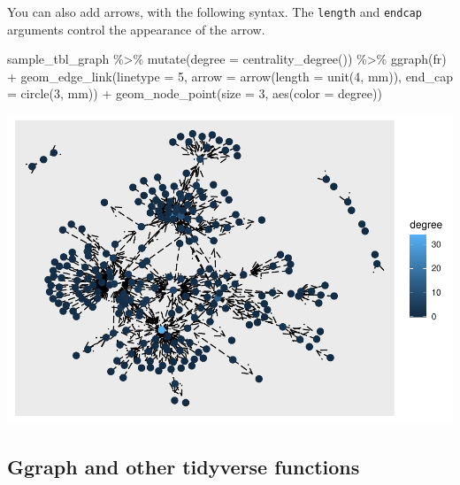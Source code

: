 \documentclass[
]{book}
\newenvironment{Shaded}{\begin{snugshade}}{\end{snugshade}}
\newcommand{\AttributeTok}[1]{\textcolor[rgb]{0.77,0.63,0.00}{#1}}
\newcommand{\DecValTok}[1]{\textcolor[rgb]{0.00,0.00,0.81}{#1}}
\newcommand{\FunctionTok}[1]{\textcolor[rgb]{0.00,0.00,0.00}{#1}}
\newcommand{\NormalTok}[1]{#1}
\newcommand{\SpecialCharTok}[1]{\textcolor[rgb]{0.00,0.00,0.00}{#1}}
\newcommand{\StringTok}[1]{\textcolor[rgb]{0.31,0.60,0.02}{#1}}
\begin{document}
You can also add arrows, with the following syntax. The \texttt{length} and \texttt{endcap} arguments control the appearance of the arrow.

\begin{Shaded}
\begin{Highlighting}[]
\NormalTok{sample\_tbl\_graph }\SpecialCharTok{\%\textgreater{}\%} 
  \FunctionTok{mutate}\NormalTok{(}\AttributeTok{degree =} \FunctionTok{centrality\_degree}\NormalTok{()) }\SpecialCharTok{\%\textgreater{}\%} 
  \FunctionTok{ggraph}\NormalTok{(}\StringTok{\textquotesingle{}fr\textquotesingle{}}\NormalTok{) }\SpecialCharTok{+} 
  \FunctionTok{geom\_edge\_link}\NormalTok{(}\AttributeTok{linetype =} \DecValTok{5}\NormalTok{,}
                 \AttributeTok{arrow =} \FunctionTok{arrow}\NormalTok{(}\AttributeTok{length =} \FunctionTok{unit}\NormalTok{(}\DecValTok{4}\NormalTok{, }\StringTok{\textquotesingle{}mm\textquotesingle{}}\NormalTok{)), }
                   \AttributeTok{end\_cap =} \FunctionTok{circle}\NormalTok{(}\DecValTok{3}\NormalTok{, }\StringTok{\textquotesingle{}mm\textquotesingle{}}\NormalTok{)) }\SpecialCharTok{+} 
  \FunctionTok{geom\_node\_point}\NormalTok{(}\AttributeTok{size =} \DecValTok{3}\NormalTok{, }\FunctionTok{aes}\NormalTok{(}\AttributeTok{color =}\NormalTok{ degree))}
\end{Highlighting}
\end{Shaded}

\includegraphics{_main_files/figure-latex/unnamed-chunk-63-1.pdf}

\hypertarget{ggraph-and-other-tidyverse-functions}{%
\subsection{Ggraph and other tidyverse functions}\label{ggraph-and-other-tidyverse-functions}}
\end{document}
